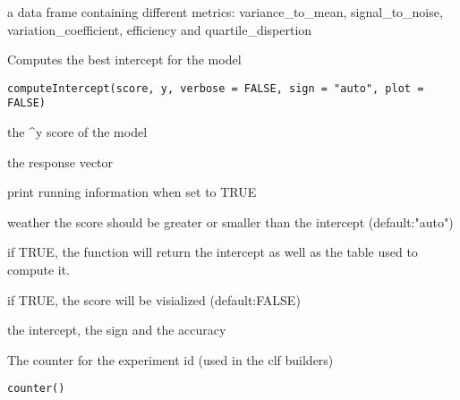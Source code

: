 \documentclass[a4paper]{book}
\begin{document}
%
\begin{Value}
a data frame containing different metrics: variance\_to\_mean, signal\_to\_noise, variation\_coefficient, efficiency and quartile\_dispertion
\end{Value}
%
\begin{Description}
Computes the best intercept for the model
\end{Description}
%
\begin{Usage}
\begin{verbatim}
computeIntercept(score, y, verbose = FALSE, sign = "auto", plot = FALSE)
\end{verbatim}
\end{Usage}
%
\begin{Arguments}
\begin{ldescription}
\item[\code{score:}] the \textasciicircum{}y score of the model

\item[\code{y:}] the response vector

\item[\code{verbose:}] print running information when set to TRUE

\item[\code{sign:}] weather the score should be greater or smaller than the intercept (default:"auto")

\item[\code{return.all:}] if TRUE, the function will return the intercept as well as the table used to compute it.

\item[\code{plot:}] if TRUE, the score will be visialized (default:FALSE)
\end{ldescription}
\end{Arguments}
%
\begin{Value}
the intercept, the sign and the accuracy
\end{Value}
%
\begin{Description}
The counter for the experiment id (used in the clf builders)
\end{Description}
%
\begin{Usage}
\begin{verbatim}
counter()
\end{verbatim}
\end{Usage}
\end{document}
